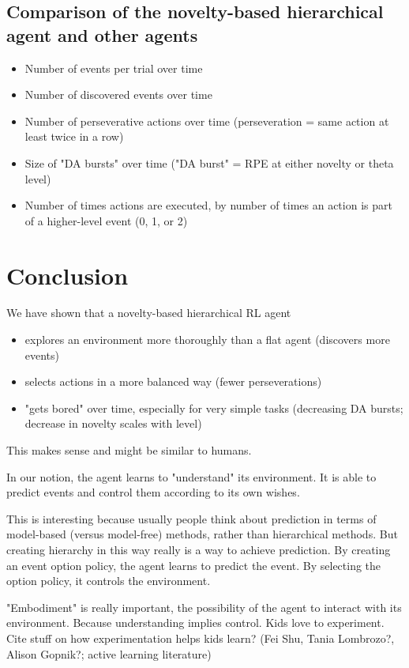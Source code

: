 \documentclass{article}
\begin{document}
\subsection{Comparison of the novelty-based hierarchical agent and other agents}

\begin{itemize}
	\item Number of events per trial over time
	\item Number of discovered events over time
	\item Number of perseverative actions over time (perseveration = same action at least twice in a row)
	\item Size of "DA bursts" over time ("DA burst" = RPE at either novelty or theta level)
	\item Number of times actions are executed, by number of times an action is part of a higher-level event (0, 1, or 2)
\end{itemize}

\section{Conclusion}

We have shown that a novelty-based hierarchical RL agent
\begin{itemize}
	\item explores an environment more thoroughly than a flat agent (discovers more events)
	\item selects actions in a more balanced way (fewer perseverations)
	\item "gets bored" over time, especially  for very simple tasks (decreasing DA bursts; decrease in novelty scales with level)
\end{itemize}

This makes sense and might be similar to humans.

In our notion, the agent learns to "understand" its environment. It is able to predict events and control them according to its own wishes.

This is interesting because usually people think about prediction in terms of model-based (versus model-free) methods, rather than hierarchical methods. But creating hierarchy in this way really is a way to achieve prediction. By creating an event option policy, the agent learns to predict the event. By selecting the option policy, it controls the environment.

"Embodiment" is really important, the possibility of the agent to interact with its environment. Because understanding implies control. Kids love to experiment. Cite stuff on how experimentation helps kids learn? (Fei Shu, Tania Lombrozo?, Alison Gopnik?; active learning literature)
\end{document}
